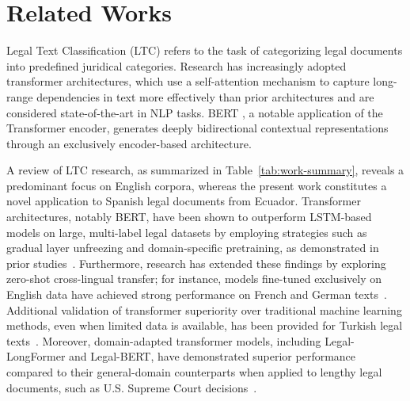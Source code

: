 \documentclass[runningheads]{llncs}
\begin{document}
\section{Related Works}
\label{sec:related-works}


Legal Text Classification (LTC) refers to the task of categorizing
legal documents into predefined juridical categories. Research has
increasingly adopted transformer architectures, which use a
self-attention mechanism to capture long-range dependencies in text
more effectively than prior architectures
\cite{tunstall2022natural,vaswani2017attention} and are considered
state-of-the-art in NLP tasks. BERT \cite{devlin2018bert}, a notable
application of the Transformer encoder, generates deeply bidirectional
contextual representations through an exclusively encoder-based
architecture.

A review of LTC research, as summarized in
Table~\ref{tab:work-summary}, reveals a predominant focus on English
corpora, whereas the present work constitutes a novel application to
Spanish legal documents from Ecuador. Transformer architectures,
notably BERT, have been shown to outperform LSTM-based models on
large, multi-label legal datasets by employing strategies such as
gradual layer unfreezing and domain-specific pretraining, as
demonstrated in prior studies~\cite{Shaheen2020}. Furthermore,
research has extended these findings by exploring zero-shot
cross-lingual transfer; for instance, models fine-tuned exclusively on
English data have achieved strong performance on French and German
texts~\cite{Shaheen2021}. Additional validation of transformer
superiority over traditional machine learning methods, even when
limited data is available, has been provided for Turkish legal
texts~\cite{Akca2022}. Moreover, domain-adapted transformer models,
including Legal-LongFormer and Legal-BERT, have demonstrated superior
performance compared to their general-domain counterparts when applied
to lengthy legal documents, such as U.S. Supreme Court
decisions~\cite{Vatsal2023}.
\end{document}
